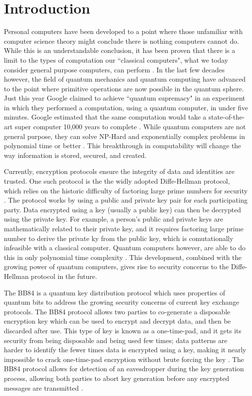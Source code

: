 \chapter{Introduction}
\label{chap:introduction}

Personal computers have been developed to a point where those unfamiliar with computer science theory might conclude there is nothing computers cannot do.
While this is an understandable conclusion, it has been proven that there is a limit to the types of computation our ``classical computers", what we today consider general purpose computers, can perform \cite{linz}.
In the last few decades however, the field of quantum mechanics and quantum computing have advanced to the point where primitive operations are now possible in the quantum sphere.
Just this year Google claimed to achieve ``quantum supremacy" in an experiment in which they performed a computation, using a quantum computer, in under five minutes. 
Google estimated that the same computation would take a state-of-the-art super computer 10,000 years to complete \cite{quantum_supremacy}. 
While quantum computers are not general purpose, they can solve NP-Hard and exponentially complex problems in polynomial time or better \cite{TODO}.
This breakthrough in computability will change the way information is stored, secured, and created.


Currently, encryption protocols ensure the integrity of data and identities are trusted.
One such protocol is the the widly adopted Diffe-Hellman protocol, which relies on the historic difficulty of factoring large prime numbers for security \cite{qc:agi}.
The protocol works by using a public and private key pair for each participating party.
Data encrypted using a key (usually a public key) can then be decrypted using the private key.
For example, a person's public and private keys are mathematically related to their private key, and it requires factoring large prime number to derive the private ky from the public key, which is comutationally infeasible with a classical computer.
Quantum computers however, are able to do this in only polynomial time complexity \cite{doi:10.1137/S0036144598347011}.
This development, combined with the growing power of quantum computers, gives rise to security concerns to the Diffe-Hellman protocol in the future.

The BB84 is a quantum key distribution protocol which uses properties of quantum bits to address the growing security concerns of current key exchange protocols.
The BB84 protocol allows two parties to co-generate a disposable encryption key which can be used to encrypt and decrypt data, and then be discarded after use.
This type of key is known as a one-time-pad, and it gets its security from being disposable and being used few times; data patterns are harder to identify the fewer times data is encrypted using a key, making it nearly impossible to crack one-time-pad encryption without brute forcing the key \cite{TODO}.
The BB84 protocol allows for detection of an eavesdropper during the key generation process, allowing both parties to abort key generation before any encrypted messages are transmitted \cite{qcftgu}.

